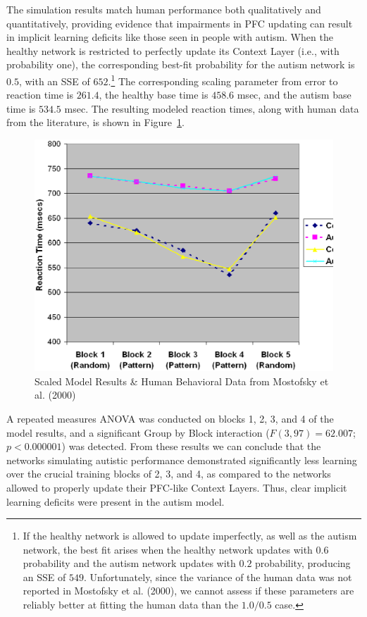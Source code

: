 \documentclass[man]{apa}
\begin{document}
The simulation results match human performance both qualitatively and quantitatively, providing evidence that impairments in PFC updating can result in implicit learning deficits like those seen in people with autism.  When the healthy network is restricted to perfectly update its Context Layer (i.e., with probability one), the corresponding best-fit probability for the autism network is $0.5$, with an SSE of $652$.\footnote{If the healthy network is allowed to update imperfectly, as well as the autism network, the best fit arises when the healthy network updates with $0.6$ probability and the autism network updates with $0.2$ probability, producing an SSE of $549$.  Unfortunately, since the variance of the human data was not reported in Mostofsky et al. (2000), we cannot assess if these parameters are reliably better at fitting the human data than the $1.0/0.5$ case.} The corresponding scaling parameter from error to reaction time is $261.4$, the healthy base time is $458.6$ msec, and the autism base time is $534.5$ msec.  The resulting modeled reaction times, along with human data from the literature, is shown in Figure~\ref{Model-Results}.

\begin{figure}[t]
\begin{center}
	\includegraphics[width=115mm]{graphs/srtt_chart.ps}
\end{center}
\caption{Scaled Model Results \& Human Behavioral Data from Mostofsky
         et al. (2000)} 
\label{Model-Results}
\end{figure} 

A repeated measures ANOVA was conducted on blocks 1, 2, 3, and 4 of the model results, and a significant Group by Block interaction ($F(3, 97) = 62.007$; $p < 0.000001$) was detected. From these results we can conclude that the networks simulating autistic performance demonstrated significantly less learning over the crucial training blocks of 2, 3, and 4, as compared to the networks allowed to properly update their PFC-like Context Layers.  Thus, clear implicit learning deficits were present in the autism model.
\end{document}
